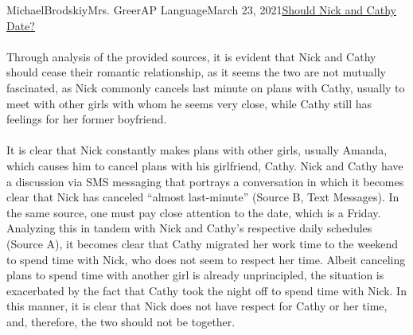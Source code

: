 \documentclass[12pt,letterpaper]{article}
\begin{document}
\begin{mla}{Michael}{Brodskiy}{Mrs. Greer}{AP Language}{March 23, 2021}{\underline{Should Nick and Cathy Date?}} 

  \begin{justify}

    \paragraph{} Through analysis of the provided sources, it is evident that Nick and Cathy should cease their romantic relationship, as it seems the two are not mutually fascinated, as Nick commonly cancels last minute on plans with Cathy, usually to meet with other girls with whom he seems very close, while Cathy still has feelings for her former boyfriend.

  \end{justify}

  \begin{justify}

    \paragraph{} It is clear that Nick constantly makes plans with other girls, usually Amanda, which causes him to cancel plans with his girlfriend, Cathy. Nick and Cathy have a discussion via SMS messaging that portrays a conversation in which it becomes clear that Nick has canceled ``almost last-minute'' (Source B, Text Messages). In the same source, one must pay close attention to the date, which is a Friday. Analyzing this in tandem with Nick and Cathy's respective daily schedules (Source A), it becomes clear that Cathy migrated her work time to the weekend to spend time with Nick, who does not seem to respect her time. Albeit canceling plans to spend time with another girl is already unprincipled, the situation is exacerbated by the fact that Cathy took the night off to spend time with Nick. In this manner, it is clear that Nick does not have respect for Cathy or her time, and, therefore, the two should not be together.

  \end{justify}

  \begin{justify}


\end{justify}
\end{mla}
\end{document}
